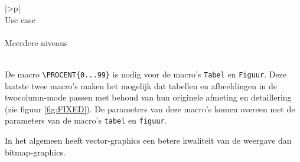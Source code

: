\begin{center}
	
\end{center}

\begin{center}
	
\end{center}

\begin{center}
	
\end{center}




\begin{center}
	\begin{tabular}{|>\C p{}|}
		\hline
		~\\
		Use case\\
		~\\
		Meerdere niveaus\\
		~\\
		\hline
	\end{tabular}
\end{center}

De macro \verb!\PROCENT{0...99}! is nodig voor de macro's \verb!Tabel!
en \verb!Figuur!. Deze laatste twee macro's maken het mogelijk dat
tabellen en afbeeldingen in de twocolumn-mode passen met behoud van
hun originele afmeting en detaillering (zie
figuur \ref{fig:FIXED}). De parameters van deze macro's komen overeen
met de parameters van de macro's \verb!tabel! en \verb!figuur!.


\begin{center}
	
\end{center}

\begin{center}
	
\end{center}

In het algemeen heeft vector-graphics een betere kwaliteit van de
weergave dan bitmap-graphics.


